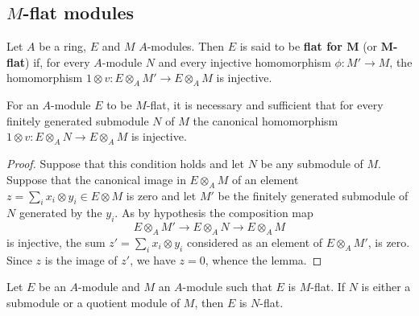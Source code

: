 \subsection{\texorpdfstring{$M$}{M}-flat modules}
Let $A$ be a ring, $E$ and $M$ $A$-modules. Then $E$ is said to be \textbf{flat for $\bm{M}$} (or \textbf{$\bm{M}$-flat}) if, for every $A$-module $N$ and every injective homomorphism $\phi:M'\to M$, the homomorphism $1\otimes v:E\otimes_AM'\to E\otimes_AM$ is injective.
\begin{lemma}\label{module flat iff finite submodule}
For an $A$-module $E$ to be $M$-flat, it is necessary and sufficient that for every finitely generated submodule $N$ of $M$ the canonical homomorphism $1\otimes v:E\otimes_AN\to E\otimes_AM$ is injective.
\end{lemma}
\begin{proof}
Suppose that this condition holds and let $N$ be any submodule of $M$. Suppose that the canonical image in $E\otimes_AM$ of an element $z=\sum_ix_i\otimes y_i\in E\otimes M$ is zero and let $M'$ be the finitely generated submodule of $N$ generated by the $y_i$. As by hypothesis the composition map
\[E\otimes_AM'\to E\otimes_AN\to E\otimes_AM\]
is injective, the sum $z'=\sum_ix_i\otimes y_i$ considered as an element of $E\otimes_AM'$, is zero. Since $z$ is the image of $z'$, we have $z=0$, whence the lemma.
\end{proof}
\begin{lemma}\label{module submodule quotient flat}
Let $E$ be an $A$-module and $M$ an $A$-module such that $E$ is $M$-flat. If $N$ is either a submodule or a quotient module of $M$, then $E$ is $N$-flat.
\end{lemma}
